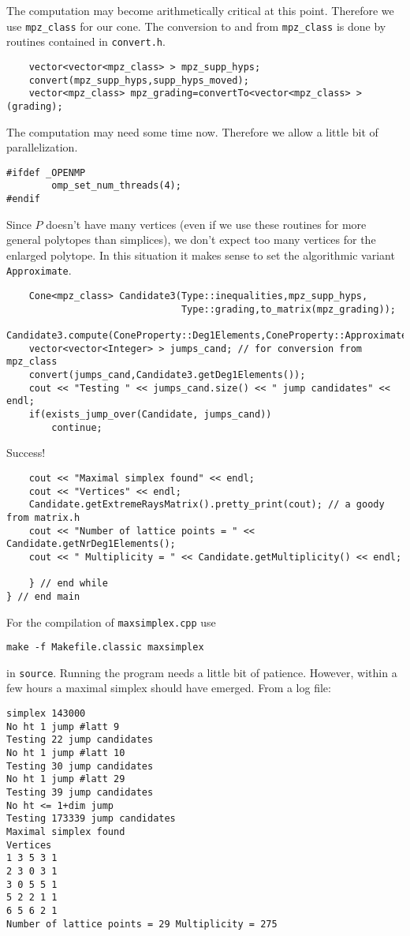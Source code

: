 \begin{small}
The computation may become arithmetically critical at this point. Therefore we use \verb|mpz_class| for our cone. The conversion to and from \verb|mpz_class| is done by routines contained in \verb|convert.h|.
\begin{Verbatim}
    vector<vector<mpz_class> > mpz_supp_hyps;
    convert(mpz_supp_hyps,supp_hyps_moved);
    vector<mpz_class> mpz_grading=convertTo<vector<mpz_class> >(grading);
\end{Verbatim}
The computation may need some time now. Therefore we allow a little bit of parallelization.
\begin{Verbatim}
#ifdef _OPENMP
        omp_set_num_threads(4);
#endif
\end{Verbatim}
Since $P$ doesn't have many vertices (even if we use these routines for more general polytopes than simplices), we don't expect too many vertices for the enlarged polytope. In this situation it makes sense to set the algorithmic variant \verb|Approximate|.
\begin{Verbatim}
    Cone<mpz_class> Candidate3(Type::inequalities,mpz_supp_hyps,
                               Type::grading,to_matrix(mpz_grading));
    Candidate3.compute(ConeProperty::Deg1Elements,ConeProperty::Approximate);
    vector<vector<Integer> > jumps_cand; // for conversion from mpz_class
    convert(jumps_cand,Candidate3.getDeg1Elements());
    cout << "Testing " << jumps_cand.size() << " jump candidates" << endl;
    if(exists_jump_over(Candidate, jumps_cand))
        continue;
\end{Verbatim}
Success!
\begin{Verbatim}
    cout << "Maximal simplex found" << endl;
    cout << "Vertices" << endl;
    Candidate.getExtremeRaysMatrix().pretty_print(cout); // a goody from matrix.h
    cout << "Number of lattice points = " << Candidate.getNrDeg1Elements();
    cout << " Multiplicity = " << Candidate.getMultiplicity() << endl; 

    } // end while
} // end main
\end{Verbatim}

For the compilation of \verb|maxsimplex.cpp| use
\begin{Verbatim}
make -f Makefile.classic maxsimplex
\end{Verbatim}
in \verb|source|. Running the program needs a little bit of patience. However, within a few hours a maximal simplex should have emerged. From a log file:
\begin{Verbatim}
simplex 143000
No ht 1 jump #latt 9
Testing 22 jump candidates
No ht 1 jump #latt 10
Testing 30 jump candidates
No ht 1 jump #latt 29
Testing 39 jump candidates
No ht <= 1+dim jump
Testing 173339 jump candidates
Maximal simplex found
Vertices
1 3 5 3 1
2 3 0 3 1
3 0 5 5 1
5 2 2 1 1
6 5 6 2 1
Number of lattice points = 29 Multiplicity = 275
\end{Verbatim}

\end{small}


